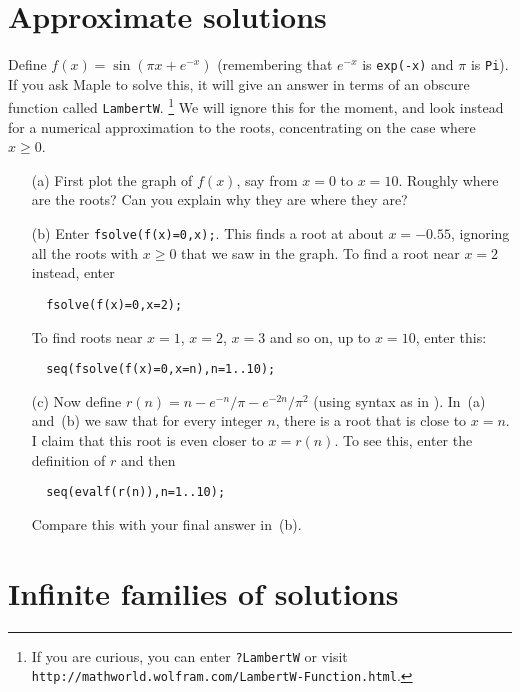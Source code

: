 \documentclass[a4paper,10pt]{amsbook}
\numberwithin{example}{chapter}
\begin{document}
\section{Approximate solutions}

\begin{exercise}\label{ex-adjusted-sin}
 Define $f(x)=\sin(\pi x+e^{-x})$ (remembering that $e^{-x}$ is
 \verb~exp(-x)~ and $\pi$ is \verb~Pi~).  If you ask Maple to solve
 this, it will give an answer in terms of an obscure function called
 \verb~LambertW~.  \footnote{If you are curious, you can enter
   \verb~?LambertW~ or visit
   \verb~http://mathworld.wolfram.com/LambertW-Function.html~.} 
 We will ignore this for the moment, and look instead for a numerical
 approximation to the roots, concentrating on the case where
 $x\geq 0$.
 \begin{itemize}
  \item[(a)] First plot the graph of $f(x)$, say from $x=0$ to $x=10$. 
   Roughly where are the roots?  Can you explain why they are where
   they are? 
  \item[(b)] Enter \verb~fsolve(f(x)=0,x);~.  This finds a root at
   about $x=-0.55$, ignoring all the roots with $x\geq 0$ that we saw
   in the graph.  To find a root near $x=2$ instead, enter
\begin{verbatim}
  fsolve(f(x)=0,x=2);
\end{verbatim}
   To find roots near $x=1$, $x=2$, $x=3$ and so on, up to $x=10$,
   enter this:
\begin{verbatim}
  seq(fsolve(f(x)=0,x=n),n=1..10);
\end{verbatim}
  \item[(c)] Now define $r(n)=n-e^{-n}/\pi-e^{-2n}/\pi^2$
   (using syntax as in \note{\NOTEseriesdef}).  In~(a)
   and~(b) we saw that for every integer $n$, there is a root that is
   close to $x=n$.  I claim that this root is even closer to
   $x=r(n)$.  To see this, enter the definition of $r$ and then 
\begin{verbatim}
  seq(evalf(r(n)),n=1..10);
\end{verbatim}
   Compare this with your final answer in~(b). 
 \end{itemize}
\end{exercise}

\section{Infinite families of solutions}
\end{document}
